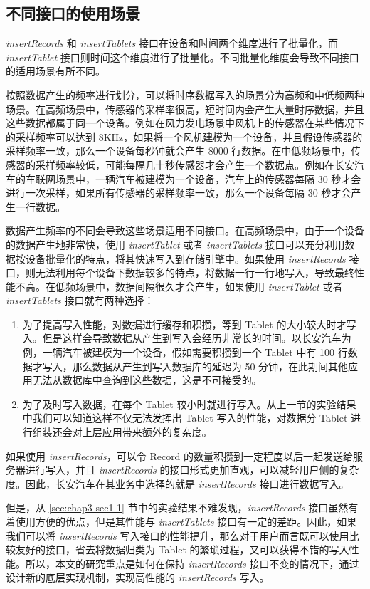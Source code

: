 \subsection{不同接口的使用场景}
\emph{insertRecords} 和 \emph{insertTablets} 接口在设备和时间两个维度进行了批量化，而 \emph{insertTablet} 接口则时间这个维度进行了批量化。不同批量化维度会导致不同接口的适用场景有所不同。

按照数据产生的频率进行划分，可以将时序数据写入的场景分为高频和中低频两种场景。在高频场景中，传感器的采样率很高，短时间内会产生大量时序数据，并且这些数据都属于同一个设备。例如在风力发电场景中风机上的传感器在某些情况下的采样频率可以达到 8KHz\cite{李天安2020apache}，如果将一个风机建模为一个设备，并且假设传感器的采样频率一致，那么一个设备每秒钟就会产生 8000 行数据。在中低频场景中，传感器的采样频率较低，可能每隔几十秒传感器才会产生一个数据点。例如在长安汽车的车联网场景中，一辆汽车被建模为一个设备，汽车上的传感器每隔 30 秒才会进行一次采样，如果所有传感器的采样频率一致，那么一个设备每隔 30 秒才会产生一行数据。

数据产生频率的不同会导致这些场景适用不同接口。在高频场景中，由于一个设备的数据产生地非常快，使用 \emph{insertTablet} 或者 \emph{insertTablets} 接口可以充分利用数据按设备批量化的特点，将其快速写入到存储引擎中。如果使用 \emph{insertRecords} 接口，则无法利用每个设备下数据较多的特点，将数据一行一行地写入，导致最终性能不高。在低频场景中，数据间隔很久才会产生，如果使用 \emph{insertTablet} 或者 \emph{insertTablets} 接口就有两种选择：
\begin{enumerate}
  \item 为了提高写入性能，对数据进行缓存和积攒，等到 Tablet 的大小较大时才写入。但是这样会导致数据从产生到写入会经历非常长的时间。以长安汽车为例，一辆汽车被建模为一个设备，假如需要积攒到一个 Tablet 中有 100 行数据才写入，那么数据从产生到写入数据库的延迟为 50 分钟，在此期间其他应用无法从数据库中查询到这些数据，这是不可接受的。
  \item 为了及时写入数据，在每个 Tablet 较小时就进行写入。从上一节的实验结果中我们可以知道这样不仅无法发挥出 Tablet 写入的性能，对数据分 Tablet 进行组装还会对上层应用带来额外的复杂度。
\end{enumerate}
如果使用 \emph{insertRecords}，可以令 Record 的数量积攒到一定程度以后一起发送给服务器进行写入，并且 \emph{insertRecords} 的接口形式更加直观，可以减轻用户侧的复杂度。因此，长安汽车在其业务中选择的就是 \emph{insertRecords} 接口进行数据写入。

但是，从 \ref{sec:chap3-sec1-1} 节中的实验结果不难发现，\emph{insertRecords} 接口虽然有着使用方便的优点，但是其性能与 \emph{insertTablets} 接口有一定的差距。因此，如果我们可以将 \emph{insertRecords} 写入接口的性能提升，那么对于用户而言既可以使用比较友好的接口，省去将数据归类为 Tablet 的繁琐过程，又可以获得不错的写入性能。所以，本文的研究重点是如何在保持 \emph{insertRecords} 接口不变的情况下，通过设计新的底层实现机制，实现高性能的 \emph{insertRecords} 写入。
